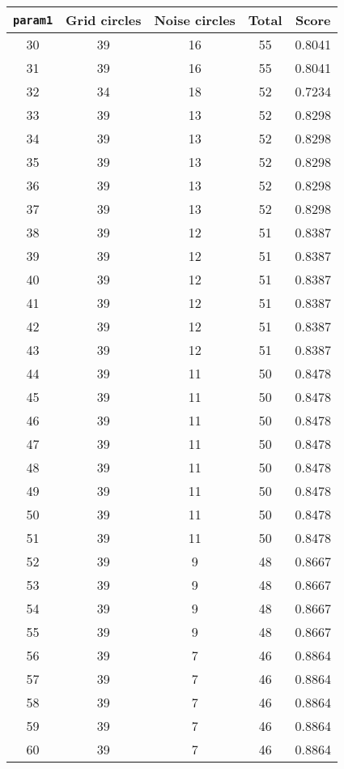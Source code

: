 \documentclass[letterpaper, 12pt]{article}
\begin{document}
\begin{longtable}{|c|c|c|c|c|}
\hline
\textbf{\texttt{param1}} & \textbf{Grid circles} & \textbf{Noise circles} & \textbf{Total} & \textbf{Score} \\
\hline
30 & 39 & 16 & 55 & 0.8041 \\
\hline
31 & 39 & 16 & 55 & 0.8041 \\
\hline
32 & 34 & 18 & 52 & 0.7234 \\
\hline
33 & 39 & 13 & 52 & 0.8298 \\
\hline
34 & 39 & 13 & 52 & 0.8298 \\
\hline
35 & 39 & 13 & 52 & 0.8298 \\
\hline
36 & 39 & 13 & 52 & 0.8298 \\
\hline
37 & 39 & 13 & 52 & 0.8298 \\
\hline
38 & 39 & 12 & 51 & 0.8387 \\
\hline
39 & 39 & 12 & 51 & 0.8387 \\
\hline
40 & 39 & 12 & 51 & 0.8387 \\
\hline
41 & 39 & 12 & 51 & 0.8387 \\
\hline
42 & 39 & 12 & 51 & 0.8387 \\
\hline
43 & 39 & 12 & 51 & 0.8387 \\
\hline
44 & 39 & 11 & 50 & 0.8478 \\
\hline
45 & 39 & 11 & 50 & 0.8478 \\
\hline
46 & 39 & 11 & 50 & 0.8478 \\
\hline
47 & 39 & 11 & 50 & 0.8478 \\
\hline
48 & 39 & 11 & 50 & 0.8478 \\
\hline
49 & 39 & 11 & 50 & 0.8478 \\
\hline
50 & 39 & 11 & 50 & 0.8478 \\
\hline
51 & 39 & 11 & 50 & 0.8478 \\
\hline
52 & 39 & 9 & 48 & 0.8667 \\
\hline
53 & 39 & 9 & 48 & 0.8667 \\
\hline
54 & 39 & 9 & 48 & 0.8667 \\
\hline
55 & 39 & 9 & 48 & 0.8667 \\
\hline
56 & 39 & 7 & 46 & 0.8864 \\
\hline
57 & 39 & 7 & 46 & 0.8864 \\
\hline
58 & 39 & 7 & 46 & 0.8864 \\
\hline
59 & 39 & 7 & 46 & 0.8864 \\
\hline
60 & 39 & 7 & 46 & 0.8864 \\

\end{longtable}
\end{document}

